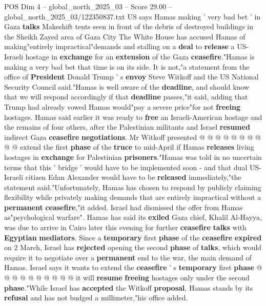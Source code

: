 \begin{textsample}{POS Dim 4 – global\_north\_2025\_03 – Score 29.00 – global\_north\_2025\_03/122350837.txt}  \label{ex:f4_pos_069}
US says Hamas making ' very bad bet ' in Gaza \textbf{talks} Makeshift tents seen in front of the debris of destroyed buildings in the Sheikh Zayed area of Gaza City The White House has accused Hamas of making"entirely impractical"demands and stalling on a \textbf{deal} to \textbf{release} a US-Israeli hostage in \textbf{exchange} for an \textbf{extension} of the Gaza \textbf{ceasefire}."Hamas is making a very bad bet that time is on its side.
It is not,"a statement from the office of \textbf{President} Donald Trump ' s \textbf{envoy} Steve Witkoff and the US National Security Council said."Hamas is well aware of the \textbf{deadline}, and should know that we will respond accordingly if that \textbf{deadline} passes,"it said, adding that Trump had already vowed Hamas would"pay a severe price"for not \textbf{freeing} hostages.
Hamas said earlier it was ready to \textbf{free} an Israeli-American hostage and the remains of four others, after the Palestinian militants and Israel \textbf{resumed} indirect Gaza \textbf{ceasefire} \textbf{negotiations}.
Mr Witkoff presented @ @ @ @ @ @ @ @ @ @ extend the first \textbf{phase} of the \textbf{truce} to mid-April if Hamas \textbf{releases} living hostages in \textbf{exchange} for Palestinian \textbf{prisoners}."Hamas was told in no uncertain terms that this ' bridge ' would have to be implemented soon - and that dual US-Israeli citizen Edan Alexander would have to be \textbf{released} immediately,"the statement said."Unfortunately, Hamas has chosen to respond by publicly claiming flexibility while privately making demands that are entirely impractical without a \textbf{permanent} \textbf{ceasefire},"it added.
Israel had dismissed the offer from Hamas as"psychological warfare".
Hamas has said its \textbf{exiled} Gaza chief, Khalil Al-Hayya, was due to arrive in Cairo later this evening for further \textbf{ceasefire} \textbf{talks} with \textbf{Egyptian} \textbf{mediators}.
Since a \textbf{temporary} first \textbf{phase} of the \textbf{ceasefire} \textbf{expired} on 2 March, Israel has \textbf{rejected} opening the second \textbf{phase} of \textbf{talks}, which would require it to negotiate over a \textbf{permanent} end to the war, the main demand of Hamas.
Israel says it wants to extend the \textbf{ceasefire} ' s \textbf{temporary} first \textbf{phase} @ @ @ @ @ @ @ @ @ @ it will \textbf{resume} \textbf{freeing} hostages only under the second \textbf{phase}."While Israel has \textbf{accepted} the Witkoff \textbf{proposal}, Hamas stands by its \textbf{refusal} and has not budged a millimeter,"his office added.

\end{textsample}
